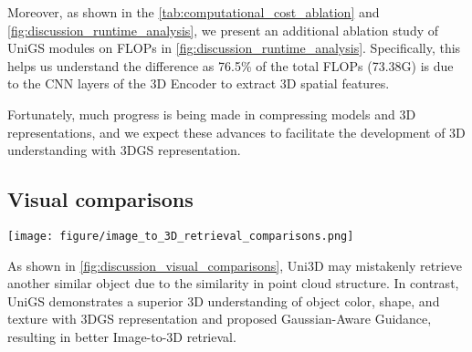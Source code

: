 Moreover, as shown in the \cref{tab:computational_cost_ablation} and \cref{fig:discussion_runtime_analysis}, we present an additional ablation study of UniGS modules on FLOPs in \cref{fig:discussion_runtime_analysis}. Specifically, this helps us understand the difference as 76.5\% of the total FLOPs (73.38G) is due to the CNN layers of the 3D Encoder to extract 3D spatial features.

Fortunately, much progress is being made in compressing models\citep{yang2024t3dnet} and 3D representations\citep{fan2023lightgaussian}, and we expect these advances to facilitate the development of 3D understanding with 3DGS representation.

\subsection{Visual comparisons}
\begin{figure*}[h]
    \centerline{\texttt{[image: figure/image\_to\_3D\_retrieval\_comparisons.png]}}
    \caption{\textbf{Visual comparisons to Uni3D on Image-to-3D retrieval.} With 3D Gaussian Splatting representation capturing image details and a powerful Gaussian-Aware Guidance module, UniGS outperforms Uni3D in 3D understanding of object color, shape, and texture.}
    \label{fig:discussion_visual_comparisons}
\end{figure*}

As shown in \cref{fig:discussion_visual_comparisons}, Uni3D may mistakenly retrieve another similar object due to the similarity in point cloud structure. In contrast, UniGS demonstrates a superior 3D understanding of object color, shape, and texture with 3DGS representation and proposed Gaussian-Aware Guidance, resulting in better Image-to-3D retrieval. 